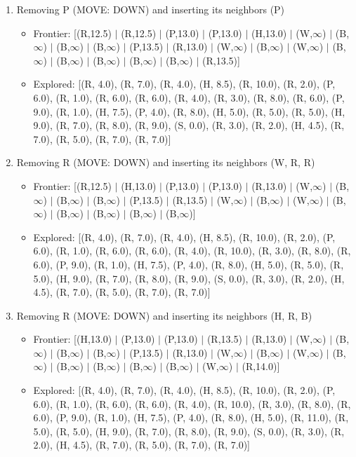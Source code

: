 \documentclass[12pt]{article}
\begin{document}
\begin{enumerate}
\item Removing P (MOVE: DOWN) and inserting its neighbors (P)
\begin{itemize}
\item Frontier: [(R,12.5) \(|\) (R,12.5) \(|\) (P,13.0) \(|\) (P,13.0) \(|\) (H,13.0) \(|\) (W,\(\infty\)) \(|\) (B,\(\infty\)) \(|\) (B,\(\infty\)) \(|\) (B,\(\infty\)) \(|\) (P,13.5) \(|\) (R,13.0) \(|\) (W,\(\infty\)) \(|\) (B,\(\infty\)) \(|\) (W,\(\infty\)) \(|\) (B,\(\infty\)) \(|\) (B,\(\infty\)) \(|\) (B,\(\infty\)) \(|\) (B,\(\infty\)) \(|\) (B,\(\infty\)) \(|\) (R,13.5)]
\item Explored: [(R, 4.0), (R, 7.0), (R, 4.0), (H, 8.5), (R, 10.0), (R, 2.0), (P, 6.0), (R, 1.0), (R, 6.0), (R, 6.0), (R, 4.0), (R, 3.0), (R, 8.0), (R, 6.0), (P, 9.0), (R, 1.0), (H, 7.5), (P, 4.0), (R, 8.0), (H, 5.0), (R, 5.0), (R, 5.0), (H, 9.0), (R, 7.0), (R, 8.0), (R, 9.0), (S, 0.0), (R, 3.0), (R, 2.0), (H, 4.5), (R, 7.0), (R, 5.0), (R, 7.0), (R, 7.0)]
\end{itemize}

\item Removing R (MOVE: DOWN) and inserting its neighbors (W, R, R)
\begin{itemize}
\item Frontier: [(R,12.5) \(|\) (H,13.0) \(|\) (P,13.0) \(|\) (P,13.0) \(|\) (R,13.0) \(|\) (W,\(\infty\)) \(|\) (B,\(\infty\)) \(|\) (B,\(\infty\)) \(|\) (B,\(\infty\)) \(|\) (P,13.5) \(|\) (R,13.5) \(|\) (W,\(\infty\)) \(|\) (B,\(\infty\)) \(|\) (W,\(\infty\)) \(|\) (B,\(\infty\)) \(|\) (B,\(\infty\)) \(|\) (B,\(\infty\)) \(|\) (B,\(\infty\)) \(|\) (B,\(\infty\))]
\item Explored: [(R, 4.0), (R, 7.0), (R, 4.0), (H, 8.5), (R, 10.0), (R, 2.0), (P, 6.0), (R, 1.0), (R, 6.0), (R, 6.0), (R, 4.0), (R, 10.0), (R, 3.0), (R, 8.0), (R, 6.0), (P, 9.0), (R, 1.0), (H, 7.5), (P, 4.0), (R, 8.0), (H, 5.0), (R, 5.0), (R, 5.0), (H, 9.0), (R, 7.0), (R, 8.0), (R, 9.0), (S, 0.0), (R, 3.0), (R, 2.0), (H, 4.5), (R, 7.0), (R, 5.0), (R, 7.0), (R, 7.0)]
\end{itemize}

\item Removing R (MOVE: DOWN) and inserting its neighbors (H, R, B)
\begin{itemize}
\item Frontier: [(H,13.0) \(|\) (P,13.0) \(|\) (P,13.0) \(|\) (R,13.5) \(|\) (R,13.0) \(|\) (W,\(\infty\)) \(|\) (B,\(\infty\)) \(|\) (B,\(\infty\)) \(|\) (B,\(\infty\)) \(|\) (P,13.5) \(|\) (R,13.0) \(|\) (W,\(\infty\)) \(|\) (B,\(\infty\)) \(|\) (W,\(\infty\)) \(|\) (B,\(\infty\)) \(|\) (B,\(\infty\)) \(|\) (B,\(\infty\)) \(|\) (B,\(\infty\)) \(|\) (B,\(\infty\)) \(|\) (W,\(\infty\)) \(|\) (R,14.0)]
\item Explored: [(R, 4.0), (R, 7.0), (R, 4.0), (H, 8.5), (R, 10.0), (R, 2.0), (P, 6.0), (R, 1.0), (R, 6.0), (R, 6.0), (R, 4.0), (R, 10.0), (R, 3.0), (R, 8.0), (R, 6.0), (P, 9.0), (R, 1.0), (H, 7.5), (P, 4.0), (R, 8.0), (H, 5.0), (R, 11.0), (R, 5.0), (R, 5.0), (H, 9.0), (R, 7.0), (R, 8.0), (R, 9.0), (S, 0.0), (R, 3.0), (R, 2.0), (H, 4.5), (R, 7.0), (R, 5.0), (R, 7.0), (R, 7.0)]
\end{itemize}


\end{enumerate}
\end{document}
